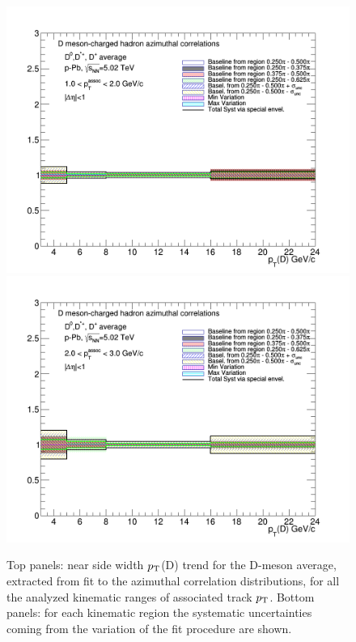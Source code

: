 \begin{figure}[!htbp]
{\includegraphics[width=0.49\linewidth, height=0.33\linewidth]{figures/FitOutput/BaselineSystematicSourcesNSSigma_pthad1dotto2dot.png}}
{\includegraphics[width=0.49\linewidth, height=0.33\linewidth]{figures/FitOutput/BaselineSystematicSourcesNSSigma_pthad2dotto3dot.png}}
\caption{Top panels: near side width $p_{\rm T}$(D) trend for the D-meson average, extracted from fit to the azimuthal correlation distributions, for all the analyzed kinematic ranges of associated track $p_{\rm T}$. Bottom panels:  for each kinematic region the systematic uncertainties coming from the variation of the fit procedure are shown.}
\label{fig:nearsidesigmaAverage}
\end{figure}

